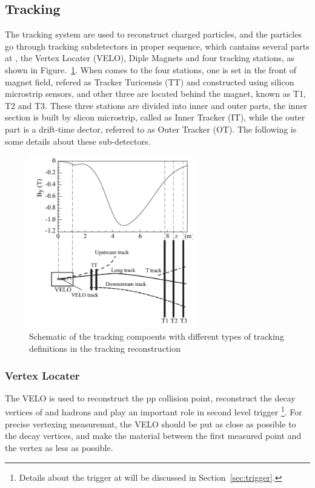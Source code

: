 \subsection{Tracking}

The tracking system are used to reconstruct charged particles,
and the particles go through tracking subdetectors in proper sequence,
which cantains several parts at \lhcb, 
the Vertex Locater (VELO), 
Diple Magnets and four tracking stations,
as shown in Figure.~\ref{fig:Tracking}.
When comes to the four stations,
one is set in the front of magnet field, 
refered as Tracker Turicensis (TT) and constructed using silicon microstrip sensors,
and other three are located behind the magnet,
known as T1, T2 and T3.
These three stations are divided into inner and outer parts,
the inner section is built by slicon microstrip, 
called as Inner Tracker (IT),
while the outer part is a drift-time dector,
referred to as Outer Tracker (OT).
The following is some details about these sub-detectors.

\begin{figure}[!hbtp]
\centering
\includegraphics[width=0.65\textwidth]{Figures/02_Detector/Tracking}%
\caption{ Schematic of the tracking compoents with different types of tracking definitions in the tracking reconstruction\supercite{LHCb-DP-2014-002}}
\label{fig:Tracking}
\end{figure}


\subsubsection{Vertex Locater}

The VELO is used to reconstruct the pp collision point,
reconstruct the decay vertices of \bquark and \cquark hadrons and play an important role in second level trigger
\footnote{Details about the trigger at \lhcb will be discussed in Section~\ref{sec:trigger}.}.
For precise vertexing measuremnt,
the VELO should be put as close as possible to the decay vertices,
and make the material between the first measured point and the vertex as less as possible.

